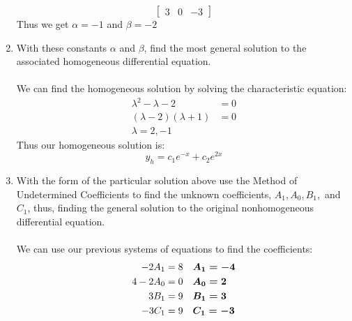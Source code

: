 \documentclass[12pt]{article}
\begin{document}
\begin{enumerate}[label = (\alph*)]
$$\begin{bmatrix}
				3 & 0 & -3
			\end{bmatrix}
			$$
		Thus we get \boldmath $\alpha = -1$ and $\beta = -2$ \unboldmath
		\newpage
		\item With these constants $\alpha$ and $\beta$, find the most general solution to the associated homogeneous differential equation. 
		\\ \\
		We can find the homogeneous solution by solving the characteristic equation:
			\begin{align*}
				\lambda^2 - \lambda - 2 &= 0 \\
				(\lambda - 2)(\lambda + 1) &= 0 \\
				\lambda = 2, -1
			\end{align*}
		Thus our homogeneous solution is:
			\boldmath
			$$
			y_h = c_1e^{-x} + c_2e^{2x}
			$$
			\unboldmath
		\item With the form of the particular solution above use the Method of Undetermined Coefficients to find the unknown coefficients, $A_1, A_0, B_1,$ and $C_1$, thus, finding the general solution to the original nonhomogeneous differential equation.
		\\ \\
		We can use our previous systems of equations to find the coefficients:
			\begin{align*}
				-2A_1 &= 8 & &\text{\boldmath $A_1 = -4$} \\
				4 - 2A_0 &= 0 & &\text{\boldmath $A_0 = 2$} \\
				3B_1 &= 9 & &\text{\boldmath $B_1 = 3$} \\
				-3C_1 &= 9 & &\text{\boldmath $C_1 = -3$}
			\end{align*}
	\end{enumerate}

\newpage
\end{document}
